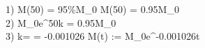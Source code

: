 1) \hspace{0.2cm} M(50) = 95\%\hspace{0.1cm}M_0 \Longrightarrow M(50) = 0.95M_0
\\
2) \hspace{0.2cm} M_0e^{50k} = 0.95M_0
\\
3) \hspace{0.2cm} k= = -0.001026 \Longrightarrow
M(t) := M_0e^{-0.001026t}
